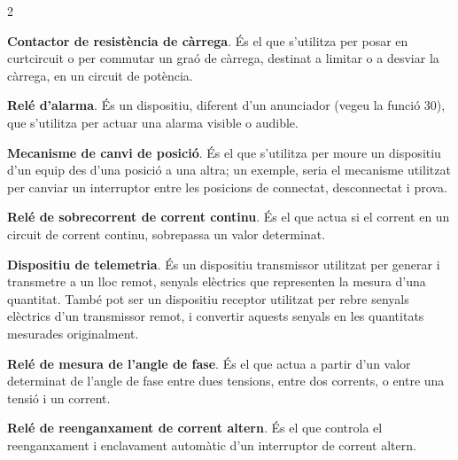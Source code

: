 \begin{multicols}{2}
\begin{list}{}
		\item[\textbf{73}]   
		\textbf{Contactor de resistència  de càrrega}. És el que s'utilitza per posar en curtcircuit o per commutar un graó de càrrega,
		destinat a limitar o a desviar la càrrega, en un circuit de potència.
		
		\item[\textbf{74}]  
		\textbf{Relé d'alarma}. És un dispositiu,
		diferent d'un anunciador (vegeu la funció 30), que s'utilitza per actuar una alarma
		visible o audible.
		
		\item[\textbf{75}]  
		\textbf{Mecanisme de canvi de posició}. És el que s'utilitza per moure un dispositiu d'un equip
		des d'una posició a una altra; un  exemple, seria el mecanisme
		utilitzat per canviar un interruptor entre les posicions de
		connectat, desconnectat i prova.
		
		\item[\textbf{76}]   
		\textbf{Relé de sobrecorrent de corrent continu}. És el que actua si el corrent en un circuit de
		corrent continu, sobrepassa un valor determinat.
		
		\item[\textbf{77}]   
		\textbf{Dispositiu de telemetria}. És un
		dispositiu transmissor utilitzat per generar i transmetre  a un lloc remot, senyals elèctrics que representen la mesura d'una quantitat. També pot ser un dispositiu receptor utilitzat per rebre senyals elèctrics d'un transmissor remot, i convertir aquests senyals en les quantitats mesurades originalment.
		
		\item[\textbf{78}]   
		\textbf{Relé de  mesura de l'angle de fase}. És el que actua a partir d'un valor determinat de
		l'angle de fase entre dues tensions, entre dos corrents, o entre una
		tensió i un corrent.
		
		\item[\textbf{79}]   
		\textbf{Relé de reenganxament de corrent altern}. És el que controla el reenganxament i enclavament automàtic d'un
		interruptor de corrent altern.
		

\end{list}
\end{multicols}
